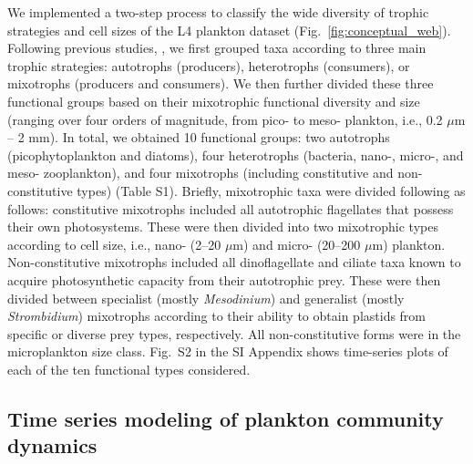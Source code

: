 \documentclass[12pt]{article}
\begin{document}
We implemented a two-step process to classify the wide diversity of trophic strategies and cell sizes of the L4 plankton dataset (Fig.~\ref{fig:conceptual_web}). Following previous studies, \citet{leles2021differences}, we first grouped taxa according to three main trophic strategies: autotrophs (producers), heterotrophs (consumers), or mixotrophs (producers and consumers). We then further divided these three functional groups based on their mixotrophic functional diversity and size (ranging over four orders of magnitude, from pico- to meso- plankton, i.e., 0.2 $\mu$m -- 2 mm). In total, we obtained 10 functional groups: two autotrophs (picophytoplankton and diatoms), four heterotrophs (bacteria, nano-, micro-, and meso- zooplankton), and four mixotrophs (including constitutive and non-constitutive types) (Table S1). Briefly, mixotrophic taxa were divided following \citet{leles2021differences} as follows: constitutive mixotrophs included all autotrophic flagellates that possess their own photosystems. These were then divided into two mixotrophic types according to cell size, i.e., nano- (2--20 $\mu$m) and micro- (20--200 $\mu$m) plankton. Non-constitutive mixotrophs included all dinoflagellate and ciliate taxa known to acquire photosynthetic capacity from their autotrophic prey. These were then divided between specialist (mostly \textit{Mesodinium}) and generalist (mostly \textit{Strombidium}) mixotrophs according to their ability to obtain plastids from specific or diverse prey types, respectively. All non-constitutive forms were in the microplankton size class. Fig.~S2 in the SI Appendix shows time-series plots of each of the ten functional types considered.

\subsection*{Time series modeling of plankton community dynamics}
\end{document}
